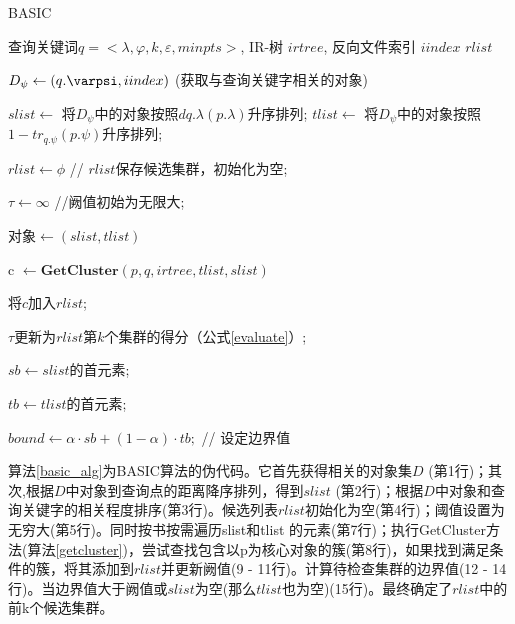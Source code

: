 \begin{algorithm}
	\caption{BASIC}
	\label{basic_alg}
	\begin{algorithmic}[1] %
			\Require 查询关键词$ q=<λ,φ,k,ε,minpts>$, IR-树 $irtree$, 反向文件索引 $iindex$
			\Ensure $rlist$

			\State $D_\psi \gets (q.\varpsi,iindex)$ \qquad(获取与查询关键字相关的对象)

			\State $slist \gets$ 将$D_\psi$中的对象按照$dq.\lambda(p.\lambda)$升序排列;
			\State $tlist \gets$ 将$D_\psi$中的对象按照$1-tr_{q.\psi} (p.\psi)$升序排列;
			
			\State $rlist \gets \phi$ // $rlist$保存候选集群，初始化为空;

			\State $\tau \gets \infty$ //阙值初始为无限大;
			
			\Repeat 

			\State 对象$ \gets (slist, tlist)$

			\State c $\gets \textbf{GetCluster}(p,q,irtree,tlist,slist)$ 
			
				\State 将$c$加入$rlist$;

				\State $\tau $更新为$rlist$第$k$个集群的得分（公式\ref{evaluate}）;

				\State $sb \gets slist$的首元素;

				\State $tb \gets tlist$的首元素;

				\State $bound \gets \alpha · sb+(1-\alpha)·tb;$ // 设定边界值
			\EndIf

			
		\State {}
	\end{algorithmic}
\end{algorithm}

算法\ref{basic_alg}为BASIC算法的伪代码。它首先获得相关的对象集$D$ (第1行)；其次,根据$D$中对象到查询点的距离降序排列，得到$slist$ (第2行)；根据$D$中对象和查询关键字的相关程度排序(第3行)。候选列表$rlist$初始化为空(第4行)；阈值设置为无穷大(第5行)。同时按书按需遍历slist和tlist 的元素(第7行)；执行GetCluster方法(算法\ref{getcluster})，尝试查找包含以p为核心对象的簇(第8行)，如果找到满足条件的簇，将其添加到$rlist$并更新阙值(9 - 11行)。计算待检查集群的边界值(12 - 14行)。当边界值大于阙值或$slist$为空(那么$tlist$也为空)(15行)。最终确定了$rlist$中的前k个候选集群。

